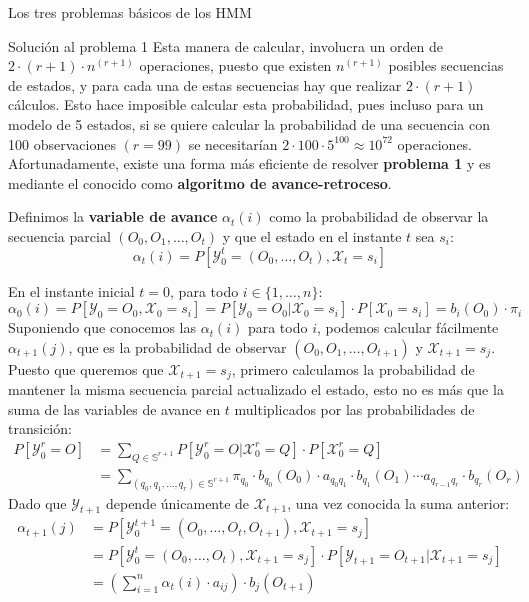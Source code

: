 \begin{section}{Los tres problemas básicos de los HMM}
\begin{subsection}{Solución al problema 1}
Esta manera de calcular, involucra un orden de $2\cdot(r+1)\cdot n^{(r+1)}$ operaciones, puesto que existen $n^{(r+1)}$ posibles secuencias de estados, y para cada una de estas secuencias hay que realizar $2\cdot(r+1)$ cálculos. Esto hace imposible calcular esta probabilidad, pues incluso para un modelo de 5 estados, si se quiere calcular la probabilidad de una secuencia con 100 observaciones $(r=99)$ se necesitarían $2\cdot100\cdot5^{100}\approx10^{72}$ operaciones. Afortunadamente, existe una forma más eficiente de resolver \textbf{problema 1} y es mediante el conocido como \textbf{algoritmo de avance-retroceso}. 

\begin{definition}
Definimos la \textbf{variable de avance} $\alpha_t(i)$ como la probabilidad de observar la secuencia parcial $(O_0,O_1,\dots,O_t)$ y que el estado en el instante $t$ sea $s_i$:
\[ \alpha_t(i)=P[\mathcal{Y}_0^t=(O_0,\dots,O_t), \mathcal{X}_t=s_i]\]
\end{definition}
En el instante inicial $t=0$, para todo $i\in\{1,\dots,n\}$:
\[ \alpha_0(i)=P[\mathcal{Y}_0=O_0, \mathcal{X}_0=s_i]=P[\mathcal{Y}_0=O_0|\mathcal{X}_0=s_i]\cdot P[\mathcal{X}_0=s_i]=b_i(O_0)\cdot\pi_i\]
Suponiendo que conocemos las $\alpha_{t}(i)$ para todo $i$, podemos calcular fácilmente $\alpha_{t+1}(j)$, que es la probabilidad de observar $(O_0,O_1,\dots,O_{t+1})$ y $\mathcal{X}_{t+1}=s_j$. Puesto que queremos que $\mathcal{X}_{t+1}=s_j$, primero calculamos la probabilidad de mantener la misma secuencia parcial actualizado el estado, esto no es más que la suma de las variables de avance en $t$ multiplicados por las probabilidades de transición:
\[
\begin{aligned}
    P[\mathcal{Y}_0^r=O]&=\sum_{Q\in\mathbb{S}^{r+1}}P[\mathcal{Y}_0^r=O|\mathcal{X}_0^r=Q]\cdot P[\mathcal{X}_0^r=Q]\\
    &=\sum_{(q_0 , q_1 , \dots , q_r)\in\mathbb{S}^{r+1}}\pi_{q_0}\cdot b_{q_0}(O_0)\cdot a_{q_0q_1}\cdot b_{q_1}(O_1)\cdots a_{q_{r-1}q_r}\cdot b_{q_r}(O_r)
\end{aligned}    
\]
Dado que $\mathcal{Y}_{t+1}$ depende únicamente de $\mathcal{X}_{t+1}$, una vez conocida la suma anterior:
\[
\begin{aligned}
    \alpha_{t+1}(j)&=P[\mathcal{Y}_0^{t+1}=(O_0,\dots,O_t,O_{t+1}), \mathcal{X}_{t+1}=s_j]\\
    &=P[\mathcal{Y}_0^t=(O_0,\dots,O_t), \mathcal{X}_{t+1}=s_j]\cdot P[\mathcal{Y}_{t+1}=O_{t+1}|\mathcal{X}_{t+1}=s_j]\\
    &=\left(\sum_{i=1}^n\alpha_{t}(i)\cdot a_{ij}\right)\cdot b_j(O_{t+1})

\end{aligned}\]
\end{subsection}
\end{section}
